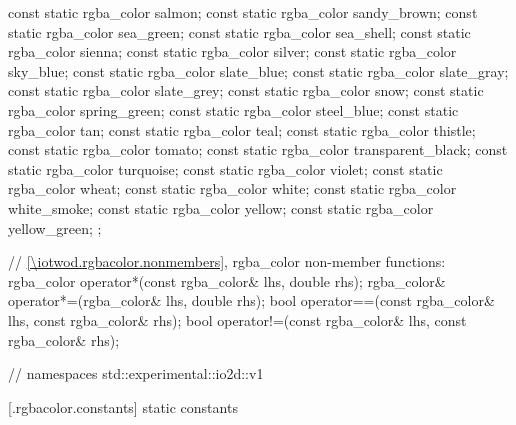 \begin{codeblock}
{{{{{    const static rgba_color salmon;
    const static rgba_color sandy_brown;
    const static rgba_color sea_green;
    const static rgba_color sea_shell;
    const static rgba_color sienna;
    const static rgba_color silver;
    const static rgba_color sky_blue;
    const static rgba_color slate_blue;
    const static rgba_color slate_gray;
    const static rgba_color slate_grey;
    const static rgba_color snow;
    const static rgba_color spring_green;
    const static rgba_color steel_blue;
    const static rgba_color tan;
    const static rgba_color teal;
    const static rgba_color thistle;
    const static rgba_color tomato;
    const static rgba_color transparent_black;
    const static rgba_color turquoise;
    const static rgba_color violet;
    const static rgba_color wheat;
    const static rgba_color white;
    const static rgba_color white_smoke;
    const static rgba_color yellow;
    const static rgba_color yellow_green;
  };

  // \ref{\iotwod.rgbacolor.nonmembers}, rgba_color non-member functions:
  rgba_color operator*(const rgba_color& lhs, double rhs);
  rgba_color& operator*=(rgba_color& lhs, double rhs);
  bool operator==(const rgba_color& lhs, const rgba_color& rhs);
  bool operator!=(const rgba_color& lhs, const rgba_color& rhs);
} } } } // namespaces std::experimental::io2d::v1
\end{codeblock}

 [\iotwod.rgbacolor.constants] { static constants}


